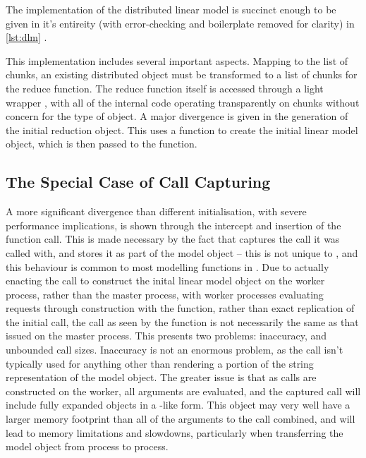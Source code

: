 The implementation of the distributed linear model is succinct enough to be given in it's entireity (with error-checking and boilerplate removed for clarity) in \cref{lst:dlm} .


This implementation includes several important aspects.
Mapping to the list of chunks, an existing distributed object must be transformed to a list of chunks for the reduce function.
The reduce function itself is accessed through a light wrapper , with all of the internal code operating transparently on chunks without concern for the type of object.
A major divergence is given in the generation of the initial reduction object.
This uses a  function to create the initial  linear model object, which is then passed to the  function.

\subsection{The Special Case of Call Capturing}

A more significant divergence than different initialisation, with severe performance implications, is shown through the intercept and insertion of the function call.
This is made necessary by the fact that  captures the call it was called with, and stores it as part of the model object -- this is not unique to , and this behaviour is common to most modelling functions in \R{}.
Due to actually enacting the call to construct the inital  linear model object on the worker process, rather than the master process, with worker processes evaluating requests through construction with the  function, rather than exact replication of the initial call, the call as seen by the function is not necessarily the same as that issued on the master process.
This presents two problems: inaccuracy, and unbounded call sizes.
Inaccuracy is not an enormous problem, as the call isn't typically used for anything other than rendering a portion of the string representation of the model object.
The greater issue is that as calls are constructed on the worker, all arguments are evaluated, and the captured call will include fully expanded objects in a -like form.
This object may very well have a larger memory footprint than all of the arguments to the call combined, and will lead to memory limitations and slowdowns, particularly when transferring the model object from process to process.


